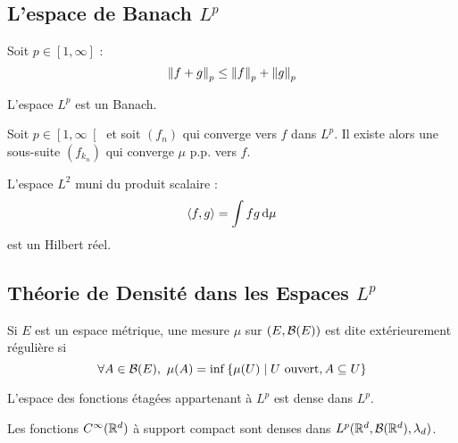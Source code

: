 \documentclass{cours}
\begin{document}
        \subsection{L'espace de Banach $L^{p}$}
        \begin{proposition}
            Soit $p \in \left[1, \infty\right]$ :
            \[
                    \left\lVert f + g \right\rVert_{p} \leq \left\lVert f \right\rVert_{p} + \left\lVert g \right\rVert_{p}
            \]
        \end{proposition}
        \begin{theorem}
            L'espace $L^{p}$ est un Banach.
        \end{theorem}

        \begin{proposition}
            Soit $p \in \left[1, \infty\right[$ et soit $(f_{n})$ qui converge vers $f$ dans $L^{p}$. Il existe alors une sous-suite $\left(f_{k_{n}}\right)$ qui converge $\mu$ p.p. vers $f$. 
        \end{proposition}

        \begin{proposition}
            L'espace $L^{2}$ muni du produit scalaire :
            \[
                \left\langle f, g \right\rangle = \int fg {\rm \, d}\mu
            \]
            est un Hilbert réel.
        \end{proposition}

        \subsection{Théorie de Densité dans les Espaces $L^{p}$}
        \begin{definition}
            Si $E$ est un espace métrique, une mesure $\mu$ sur $\left(E, \mathcal{B}(E)\right)$ est dite extérieurement régulière si
            \[
                \forall A \in \mathcal{B}(E), \ \mu(A) = \inf \left\{\mu(U) \mid U \text{ ouvert}, A \subseteq U\right\}
            \]
        \end{definition}

        \begin{theorem}
            L'espace des fonctions étagées appartenant à $L^{p}$ est dense dans $L^{p}$.
        \end{theorem}

        \begin{theorem}
            Les fonctions $C^{\infty}(\mathbb{R}^{d})$ à support compact sont denses dans $L^{p}(\mathbb{R}^{d}, \mathcal{B}(\mathbb{R}^{d}), \lambda_{d})$.
        \end{theorem}
\end{document}

